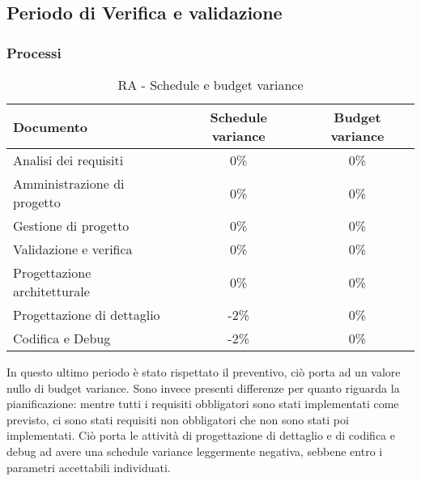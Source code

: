 \documentclass[../PianoDiQualifica.tex]{subfiles}
\begin{document}
						\subsection{Periodo di Verifica e validazione}
						\subsubsection{Processi}
						\begin{table}[H]
							\center
							\begin{tabular}{|l|c|c|}
								\hline
								\rowcolor{blue!30}\textbf{Documento} & \textbf{Schedule variance} & \textbf{Budget variance} \\ \hline
								Analisi dei requisiti & 0\% & 0\% \\ \hline
								Amministrazione di progetto & 0\% & 0\% \\ \hline
								Gestione di progetto & 0\% & 0\% \\ \hline
								Validazione e verifica & 0\% & 0\% \\ \hline
								Progettazione architetturale & 0\% & 0\% \\ \hline
								Progettazione di dettaglio & -2\% & 0\% \\ \hline
								Codifica e Debug & -2\% & 0\% \\ \hline
							\end{tabular}
							\caption{RA - Schedule e budget variance}
						\end{table}
						In questo ultimo periodo è stato rispettato il preventivo, ciò porta ad un valore nullo di budget variance. Sono invece presenti differenze per quanto riguarda la pianificazione: mentre tutti i requisiti obbligatori sono stati implementati come previsto, ci sono stati requisiti non obbligatori che non sono stati poi implementati. Ciò porta le attività di progettazione di dettaglio e di codifica e debug ad avere una schedule variance leggermente negativa, sebbene entro i parametri accettabili individuati.
\end{document}
